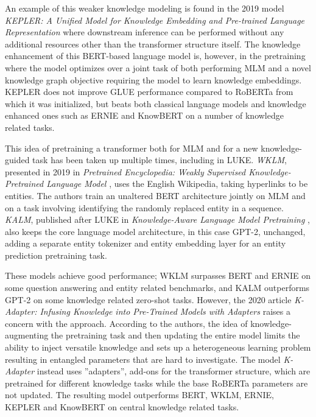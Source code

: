\documentclass[main.tex]{subfiles}
\begin{document}
An example of this weaker knowledge modeling is found in the 2019 model \emph{KEPLER: A Unified Model for Knowledge Embedding and Pre-trained Language Representation} \cite{wang2021kepler} where downstream inference can be performed without any additional resources other than the transformer structure itself.
The knowledge enhancement of this BERT-based language model is, however, in the pretraining where the model optimizes over a joint task of both performing MLM and a novel knowledge graph objective requiring the model to learn knowledge embeddings.
KEPLER does not improve GLUE performance compared to RoBERTa \cite{liu2019roberta} from which it was initialized, but beats both classical language models and knowledge enhanced ones such as ERNIE and KnowBERT on a number of knowledge related tasks.

This idea of pretraining a transformer both for MLM and for a new knowledge-guided task has been taken up multiple times, including in LUKE.
\emph{WKLM}, presented in 2019 in \emph{Pretrained Encyclopedia: Weakly Supervised Knowledge-Pretrained Language Model} \cite{xiong2019wklm}, uses the English Wikipedia, taking hyperlinks to be entities.
The authors train an unaltered BERT architecture jointly on MLM and on a task involving identifying the randomly replaced entity in a sequence.
\emph{KALM}, published after LUKE in \emph{Knowledge-Aware Language Model Pretraining} \cite{corby2020kalm}, also keeps the core language model architecture, in this case GPT-2, unchanged, adding a separate entity tokenizer and entity embedding layer for an entity prediction pretraining task.

These models achieve good performance; WKLM surpasses BERT and ERNIE on some question answering and entity related benchmarks, and KALM outperforms GPT-2 on some knowledge related zero-shot tasks.
However, the 2020 article \emph{K-Adapter: Infusing Knowledge into Pre-Trained Models with Adapters} \cite{wang2020kadapter} raises a concern with the approach.
According to the authors, the idea of knowledge-augmenting the pretraining task and then updating the entire model limits the ability to inject versatile knowledge and sets up a heterogeneous learning problem resulting in entangled parameters that are hard to investigate.
The model \emph{K-Adapter} instead uses ''adapters'', add-ons for the transformer structure, which are pretrained for different knowledge tasks while the base RoBERTa parameters are not updated.
The resulting model outperforms BERT, WKLM, ERNIE, KEPLER and KnowBERT on central knowledge related tasks.
\end{document}
